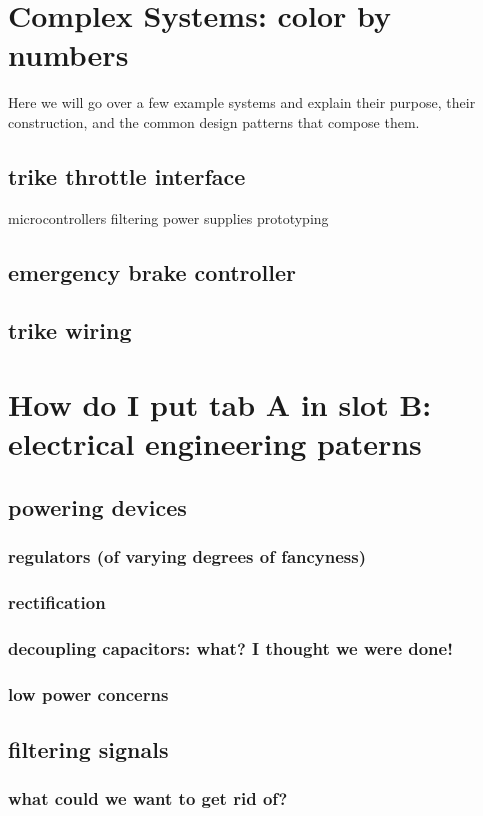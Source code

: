 \documentclass[]{journal}
\begin{document}
\section{Complex Systems: color by numbers}
	Here we will go over a few example systems and explain their purpose, their construction, and the common design patterns that compose them.
	\subsection{trike throttle interface}
		microcontrollers
		filtering
		power supplies
		prototyping 
	\subsection{emergency brake controller}
	\subsection{trike wiring}
	
\section{How do I put tab A in slot B: electrical engineering paterns}
	\subsection{powering devices}
		\subsubsection{regulators (of varying degrees of fancyness)}
		\subsubsection{rectification}
		\subsubsection{decoupling capacitors: what? I thought we were done!}
		\subsubsection{low power concerns}
	\subsection{filtering signals}
		\subsubsection{what could we want to get rid of?}
\end{document}
